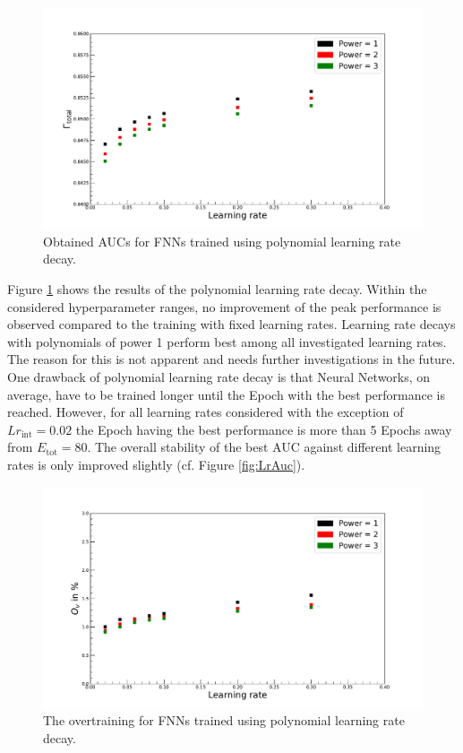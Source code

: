 \begin{figure}[H]
\centering
\includegraphics[width=0.93\linewidth]{figs/FNN/PolyAuc}
\caption{Obtained AUCs for FNNs trained using polynomial learning rate decay.}
\label{fig:PolyAuc}
\end{figure}

Figure \ref{fig:PolyAuc} shows the results of the polynomial learning rate decay.
Within the considered hyperparameter ranges, no improvement of the peak performance is observed compared to the training with fixed learning rates. Learning rate decays with polynomials of power 1 perform best among all investigated learning rates. The reason for this is not apparent and needs further investigations in the future. One drawback of polynomial learning rate decay is that Neural Networks, on average, have to be trained longer until the Epoch with the best performance is reached. However, for all learning rates considered with the exception of $Lr_{\text{int}} = 0.02$ the Epoch having the best performance is more than 5 Epochs away from $E_{\text{tot}} = 80$. The overall stability of the best AUC against different learning rates is only improved slightly (cf. Figure \ref{fig:LrAuc}). \\

\begin{figure}[H]
\centering
\includegraphics[width=0.93\linewidth]{figs/FNN/PolyOv}
\caption{The overtraining for FNNs trained using polynomial learning rate decay.}
\label{fig:PolyOv}
\end{figure}

